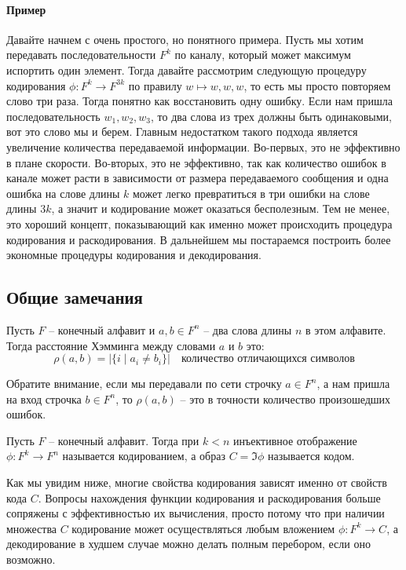 \paragraph{Пример}

Давайте начнем с очень простого, но понятного примера.
Пусть мы хотим передавать последовательности $F^k$ по каналу, который может максимум испортить один элемент.
Тогда давайте рассмотрим следующую процедуру кодирования $\phi\colon F^k \to F^{3k}$ по правилу $w\mapsto w, w, w$, то есть мы просто повторяем слово три раза.
Тогда понятно как восстановить одну ошибку.
Если нам пришла последовательность $w_1, w_2, w_3$, то два слова из трех должны быть одинаковыми, вот это слово мы и берем.
Главным недостатком такого подхода является увеличение количества передаваемой информации.
Во-первых, это не эффективно в плане скорости.
Во-вторых, это не эффективно, так как количество ошибок в канале может расти в зависимости от размера передаваемого сообщения и одна ошибка на слове длины $k$ может легко превратиться в три ошибки на слове длины $3k$, а значит и кодирование может оказаться бесполезным.
Тем не менее, это хороший концепт, показывающий как именно может происходить процедура кодирования и раскодирования.
В дальнейшем мы постараемся построить более экономные процедуры кодирования и декодирования.

\subsection{Общие замечания}

\begin{definition}
Пусть $F$ -- конечный алфавит и $a, b\in F^n$ -- два слова длины $n$ в этом алфавите.
Тогда расстояние Хэмминга между словами $a$ и $b$ это:
\[
\rho(a, b) = |\{i \mid a_i \neq b_i\}|\quad\text{количество отличающихся символов}
\]
\end{definition}

Обратите внимание, если мы передавали по сети строчку $a\in F^n$, а нам пришла на вход строчка $b\in F^n$, то $\rho(a, b)$ -- это в точности количество произошедших ошибок.

\begin{definition}
Пусть $F$ -- конечный алфавит.
Тогда при $k < n$ инъективное отображение $\phi\colon F^k \to F^n$ называется кодированием, а образ $C = \Im \phi$ называется кодом.
\end{definition}

Как мы увидим ниже, многие свойства кодирования зависят именно от свойств кода $C$.
Вопросы нахождения функции кодирования и раскодирования больше сопряжены с эффективностью их вычисления, просто потому что при наличии множества $C$ кодирование может осуществляться любым вложением $\phi \colon F^k \to C$, а декодирование в худшем случае можно делать полным перебором, если оно возможно.

